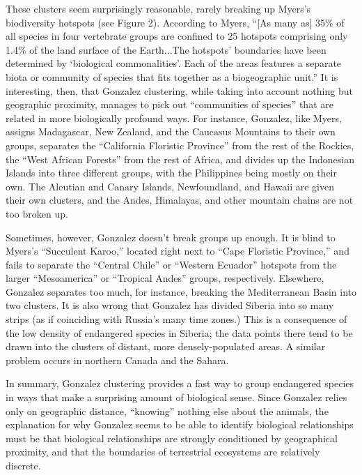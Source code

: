 \documentclass[11pt, fullpage,letterpaper]{article}
\begin{document}
		These clusters seem surprisingly reasonable, rarely breaking up Myers's biodiversity hotspots (see Figure 2). According to Myers, ``[As many as] 35\% of all species in four vertebrate groups are confined to 25 hotspots comprising only 1.4\% of the land surface of the Earth...The hotspots’ boundaries have been determined by ‘biological commonalities’. Each of the areas features a separate biota or community of species that fits together as a biogeographic unit.'' It is interesting, then, that Gonzalez clustering, while taking into account nothing but geographic proximity, manages to pick out ``communities of species'' that are related in more biologically profound ways. For instance, Gonzalez, like Myers, assigns Madagascar, New Zealand, and the Caucasus Mountains to their own groups, separates the ``California Floristic Province'' from the rest of the Rockies, the ``West African Forests'' from the rest of Africa, and divides up the Indonesian Islands into three different groups, with the Philippines being mostly on their own. The Aleutian and Canary Islands, Newfoundland, and Hawaii are given their own clusters, and the Andes, Himalayas, and other mountain chains are not too broken up. 

		Sometimes, however, Gonzalez doesn't break groups up enough. It is blind to Myers's ``Succulent Karoo,'' located right next to ``Cape Floristic Province,'' and fails to separate the ``Central Chile'' or ``Western Ecuador'' hotspots from the larger ``Mesoamerica'' or ``Tropical Andes'' groups, respectively. Elsewhere, Gonzalez separates too much, for instance, breaking the Mediterranean Basin into two clusters. It is also wrong that Gonzalez has divided Siberia into so many strips (as if coinciding with Russia's many time zones.) This is a consequence of the low density of endangered species in Siberia; the data points there tend to be drawn into the clusters of distant, more densely-populated areas. A similar problem occurs in northern Canada and the Sahara.

		In summary, Gonzalez clustering provides a fast way to group endangered species in ways that make a surprising amount of biological sense. Since Gonzalez relies only on geographic distance, ``knowing'' nothing else about the animals, the explanation for why Gonzalez seems to be able to identify biological relationships must be that biological relationships are strongly conditioned by geographical proximity, and that the boundaries of terrestrial ecosystems are relatively discrete.
		
\end{document}

